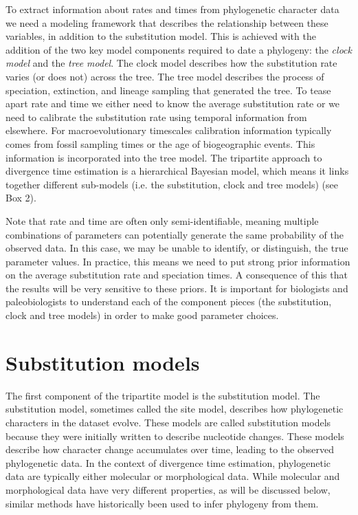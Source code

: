 \documentclass[11pt]{article}
\begin{document}
To extract information about rates and times from phylogenetic character data we need a modeling framework that describes the  relationship between these variables, in addition to the substitution model.
This is achieved with the addition of the two key model components required to date a phylogeny: the \textit{clock model} and the \textit{tree model}.
The clock model describes how the substitution rate varies (or does not) across the tree.
The tree model describes the process of speciation, extinction, and lineage sampling that generated the tree.
To tease apart rate and time we either need to know the average substitution rate or we need to calibrate the substitution rate using temporal information from elsewhere.
For macroevolutionary timescales calibration information typically comes from fossil sampling times or the age of biogeographic events. This information is incorporated into the tree model.
The tripartite approach to divergence time estimation is a hierarchical Bayesian model, which means it links together different sub-models (i.e. the substitution, clock and tree models) (see Box 2).

Note that rate and time are often only semi-identifiable, meaning multiple combinations of parameters can potentially generate the same probability of the observed data.
In this case, we may be unable to identify, or distinguish, the true parameter values.
In practice, this means we need to put strong prior information on the average substitution rate and speciation times. 
A consequence of this that the results will be very sensitive to these priors.
It is important for biologists and paleobiologists to understand each of the component pieces (the substitution, clock and tree models) in order to make good parameter choices.

\section{Substitution models}

The first component of the tripartite model is the substitution model.
The substitution model, sometimes called the site model, describes how phylogenetic characters in the dataset evolve.
These models are called substitution models because they were initially written to describe nucleotide changes.
These models describe how character change accumulates over time, leading to the observed phylogenetic data.
In the context of divergence time estimation, phylogenetic data are typically either molecular or morphological data. 
While molecular and morphological data have very different properties, as will be discussed below, similar methods have historically been used to infer phylogeny from them.
\end{document}
